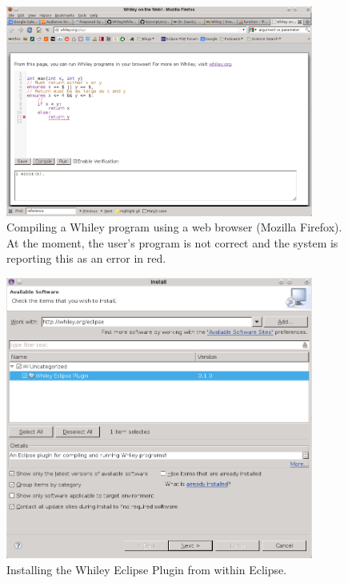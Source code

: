 \begin{figure}[!p]
\centering
\includegraphics[width=0.9\textwidth]{../images/WhileyPlay.png}
\caption{Compiling a Whiley program using a web browser (Mozilla
  Firefox).  At the moment, the user's program is not correct and the
  system is reporting this as an error in red.}
\label{whileyplay}
\end{figure}

\begin{figure}[!p]
\centering
\includegraphics[width=0.9\textwidth]{../images/WyclipseInstallation.png}
\caption{Installing the Whiley Eclipse Plugin from within Eclipse.}
\label{wyclipseinstall}
\end{figure}


